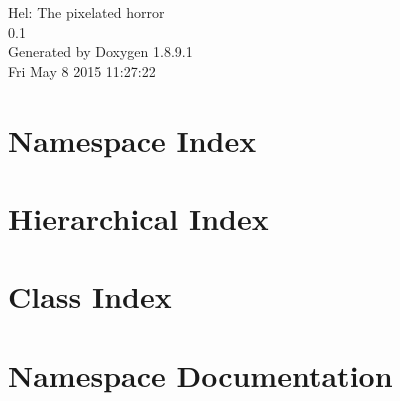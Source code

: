 \documentclass[twoside]{book}
\newcommand{\+}{\discretionary{\mbox{\scriptsize$\hookleftarrow$}}{}{}}
\newcommand{\clearemptydoublepage}{%
  \newpage{\pagestyle{empty}\cleardoublepage}%
}
\begin{document}
\hypersetup{pageanchor=false,
             bookmarks=true,
             bookmarksnumbered=true,
             pdfencoding=unicode
            }
\begin{titlepage}
\vspace*{7cm}
\begin{center}%
{\Large Hel\+: The pixelated horror \\[1ex]\large 0.\+1 }\\
\vspace*{1cm}
{\large Generated by Doxygen 1.8.9.1}\\
\vspace*{0.5cm}
{\small Fri May 8 2015 11:27:22}\\
\end{center}
\end{titlepage}
\clearemptydoublepage
\tableofcontents
\clearemptydoublepage
{}
\hypersetup{pageanchor=true}

\chapter{Namespace Index}

\chapter{Hierarchical Index}

\chapter{Class Index}

\chapter{Namespace Documentation}









\end{document}
